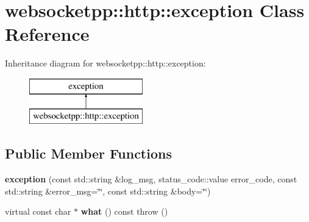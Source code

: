 \hypertarget{classwebsocketpp_1_1http_1_1exception}{}\section{websocketpp\+:\+:http\+:\+:exception Class Reference}
\label{classwebsocketpp_1_1http_1_1exception}
Inheritance diagram for websocketpp\+:\+:http\+:\+:exception\+:\begin{figure}[H]
\begin{center}
\leavevmode
\includegraphics[height=2.000000cm]{classwebsocketpp_1_1http_1_1exception}
\end{center}
\end{figure}
\subsection*{Public Member Functions}
\begin{DoxyCompactItemize}
\item 
{\bfseries exception} (const std\+::string \&log\+\_\+msg, status\+\_\+code\+::value error\+\_\+code, const std\+::string \&error\+\_\+msg=\char`\"{}\char`\"{}, const std\+::string \&body=\char`\"{}\char`\"{})\hypertarget{classwebsocketpp_1_1http_1_1exception_a909681116d200f0240aa5a2d1ee75d04}{}\label{classwebsocketpp_1_1http_1_1exception_a909681116d200f0240aa5a2d1ee75d04}

\item 
virtual const char $\ast$ {\bfseries what} () const  throw ()\hypertarget{classwebsocketpp_1_1http_1_1exception_a9f389522d82932a2b941ae7c51f48a74}{}\label{classwebsocketpp_1_1http_1_1exception_a9f389522d82932a2b941ae7c51f48a74}

\end{DoxyCompactItemize}
